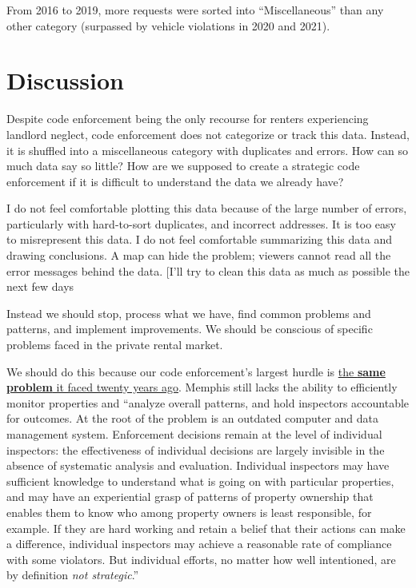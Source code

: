 \documentclass[
]{book}
\begin{document}
From 2016 to 2019, more requests were sorted into ``Miscellaneous'' than any other category (surpassed by vehicle violations in 2020 and 2021).

\hypertarget{discussion}{%
\chapter{Discussion}\label{discussion}}

Despite code enforcement being the only recourse for renters experiencing landlord neglect, code enforcement does not categorize or track this data. Instead, it is shuffled into a miscellaneous category with duplicates and errors. How can so much data say so little? How are we supposed to create a strategic code enforcement if it is difficult to understand the data we already have?

I do not feel comfortable plotting this data because of the large number of errors, particularly with hard-to-sort duplicates, and incorrect addresses. It is too easy to misrepresent this data. I do not feel comfortable summarizing this data and drawing conclusions. A map can hide the problem; viewers cannot read all the error messages behind the data. {[}I'll try to clean this data as much as possible the next few days

Instead we should stop, process what we have, find common problems and patterns, and implement improvements. We should be conscious of specific problems faced in the private rental market.

We should do this because our code enforcement's largest hurdle is \underline{the \textbf{same problem} it faced twenty years ago}. Memphis still lacks the ability to efficiently monitor properties and ``analyze overall patterns, and hold inspectors accountable for outcomes. At the root of the problem is an outdated computer and data management system. Enforcement decisions remain at the level of individual inspectors: the effectiveness of individual decisions are largely invisible in the absence of systematic analysis and evaluation. Individual inspectors may have sufficient knowledge to understand what is going on with particular properties, and may have an experiential grasp of patterns of property ownership that enables them to know who among property owners is least responsible, for example. If they are hard working and retain a belief that their actions can make a difference, individual inspectors may achieve a reasonable rate of compliance with some violators. But individual efforts, no matter how well intentioned, are by definition \emph{not strategic}.'' \citep[44]{betts2001}
\end{document}
